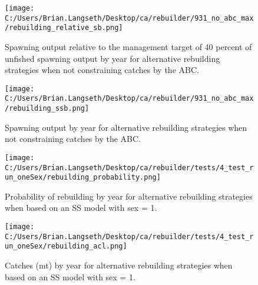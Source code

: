 \documentclass[11pt,
  english,
  a4paper,
]{article}
\begin{document}
\tagmcend\tagstructend


\begin{figure}
\centering
\texttt{[image: C:/Users/Brian.Langseth/Desktop/ca/rebuilder/931\_no\_abc\_max/rebuilding\_relative\_sb.png]}
\caption{Spawning output relative to the management target of 40 percent of unfished spawning output by year for alternative rebuilding strategies when not constraining catches by the ABC.\label{fig:rel-ssb-fig-noABCmax}}
\end{figure}

\tagmcend\tagstructend


\begin{figure}
\centering
\texttt{[image: C:/Users/Brian.Langseth/Desktop/ca/rebuilder/931\_no\_abc\_max/rebuilding\_ssb.png]}
\caption{Spawning output by year for alternative rebuilding strategies when not constraining catches by the ABC.\label{fig:rel-ssb-fig-noABCmax}}
\end{figure}

\tagmcend\tagstructend


\begin{figure}
\centering
\texttt{[image: C:/Users/Brian.Langseth/Desktop/ca/rebuilder/tests/4\_test\_run\_oneSex/rebuilding\_probability.png]}
\caption{Probability of rebuilding by year for alternative rebuilding strategies when based on an SS model with sex = 1.\label{fig:prob-fig-sex1}}
\end{figure}

\tagmcend\tagstructend


\begin{figure}
\centering
\texttt{[image: C:/Users/Brian.Langseth/Desktop/ca/rebuilder/tests/4\_test\_run\_oneSex/rebuilding\_acl.png]}
\caption{Catches (mt) by year for alternative rebuilding strategies when based on an SS model with sex = 1.\label{fig:acl-fig-sex1}}
\end{figure}
\end{document}
